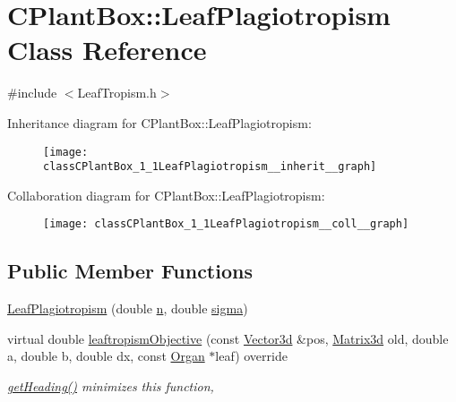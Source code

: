 \hypertarget{classCPlantBox_1_1LeafPlagiotropism}{}\section{C\+Plant\+Box\+:\+:Leaf\+Plagiotropism Class Reference}
\label{classCPlantBox_1_1LeafPlagiotropism}


{\ttfamily \#include $<$Leaf\+Tropism.\+h$>$}



Inheritance diagram for C\+Plant\+Box\+:\+:Leaf\+Plagiotropism\+:\nopagebreak
\begin{figure}[H]
\begin{center}
\leavevmode
\texttt{[image: classCPlantBox\_1\_1LeafPlagiotropism\_\_inherit\_\_graph]}
\end{center}
\end{figure}


Collaboration diagram for C\+Plant\+Box\+:\+:Leaf\+Plagiotropism\+:\nopagebreak
\begin{figure}[H]
\begin{center}
\leavevmode
\texttt{[image: classCPlantBox\_1\_1LeafPlagiotropism\_\_coll\_\_graph]}
\end{center}
\end{figure}
\subsection*{Public Member Functions}
\begin{DoxyCompactItemize}
\item 
\hyperlink{classCPlantBox_1_1LeafPlagiotropism_af130f22f6e7fae16e5d15b32ad5e0f69}{Leaf\+Plagiotropism} (double \hyperlink{classCPlantBox_1_1LeafTropismFunction_a21d8d756f8b9f6015b546def33b01c89}{n}, double \hyperlink{classCPlantBox_1_1LeafTropismFunction_a82a3dc11056a65501bc4535749c304b6}{sigma})
\item 
virtual double \hyperlink{classCPlantBox_1_1LeafPlagiotropism_af58514b24aae9a1020093d6955dadaaf}{leaftropism\+Objective} (const \hyperlink{classCPlantBox_1_1Vector3d}{Vector3d} \&pos, \hyperlink{classCPlantBox_1_1Matrix3d}{Matrix3d} old, double a, double b, double dx, const \hyperlink{classCPlantBox_1_1Organ}{Organ} $\ast$leaf) override
\begin{DoxyCompactList}\small\item\em \hyperlink{classCPlantBox_1_1LeafTropismFunction_a1440868221a834474e34e3a503a74572}{get\+Heading()} minimizes this function, \end{DoxyCompactList}\end{DoxyCompactItemize}

